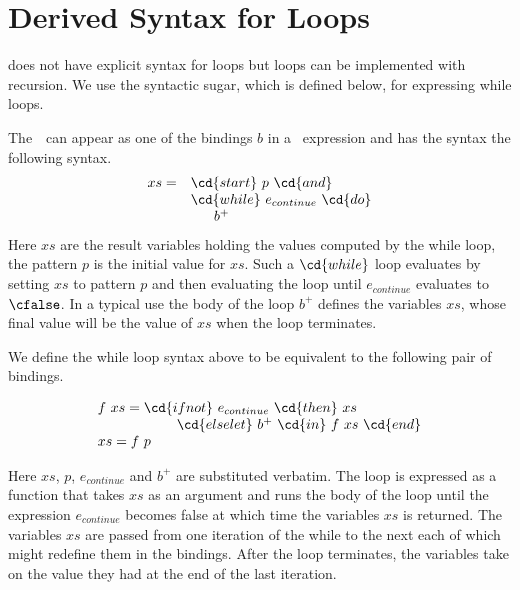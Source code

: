 \section{Derived Syntax for Loops}

\begin{gram}
\pml{} does not have explicit syntax for loops but loops can be
implemented with recursion.
%
We use the syntactic sugar, which is defined below, for expressing
while loops.
%
\end{gram}

\begin{syntax}
\label{syn:sparc::while}
The~~can appear as one of the bindings $b$ in a
~expression and has the syntax the following syntax.
%
\[
\begin{array}{ll}
xs = 
& \cd{start}~p~\cd{and}
\\
& \cd{while}~e_{continue}~\cd{do}
\\
&~~~~~b^+
\end{array}
\]
%
Here $xs$ are the result variables holding the values computed by the
while loop, the pattern $p$ is the initial value for $xs$.
%
Such a $\cd{while}$ loop evaluates by setting $xs$ to pattern $p$ and
then evaluating the loop until $e_{continue}$ evaluates to $\cfalse$.
%
In a typical use the body of the loop $b^+$ defines the variables
$xs$, whose final value will be the value of $xs$ when the loop terminates.

We define the while loop syntax above  to be equivalent to the
following pair of bindings.

\[
\begin{array}{l}
f~xs = \cd{if not}~e_{continue}~\cd{then}~xs
\\
~~~~~~~~~~~~~~~~~\cd{else let}~b^+~\cd{in}~f~xs~\cd{end}
\\
xs =  f~p
\end{array}
\]


Here $xs$, $p$, $e_{continue}$ and $b^+$ are substituted
verbatim.  
%
The loop is expressed as a function that takes $xs$ as an argument and
runs the body of the loop until the expression $e_{continue}$ becomes
false at which time the variables $xs$ is returned.
%
The variables $xs$ are passed from one iteration of the while to the next
each of which might redefine them in the bindings.  
%
After the loop terminates, the variables take on the value they had at
the end of the last iteration.


\end{syntax}

